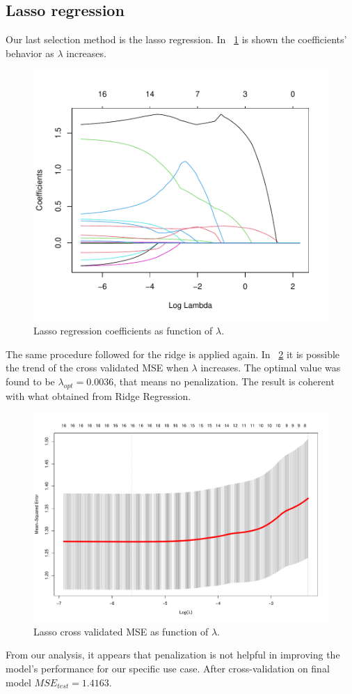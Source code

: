 \subsection{Lasso regression}

Our last selection method is the lasso regression. In \Fig~\ref{fig:LassoCoefVsLambda} is shown the coefficients' behavior as $\lambda$ increases. 

\begin{figure}[H]
	\centering
	\includegraphics[width=0.4\linewidth]{ImageFiles/Regression/Lasso/LassoCoefVsLambda.pdf}
	\caption{Lasso regression coefficients as function of $\lambda$.}
	\label{fig:LassoCoefVsLambda}
\end{figure}

The same procedure followed for the ridge is applied again. In \Fig~\ref{fig:LassoCvPlot} it is possible the trend of the cross validated MSE when $\lambda$ increases. The optimal value was found to be $\lambda_{opt} = 0.0036$, that means no penalization. The result is coherent with what obtained from Ridge Regression.

\begin{figure}[H]
	\centering
	\includegraphics[width=0.5\linewidth]{ImageFiles/Regression/Lasso/LassoCvPlot.pdf}
	\caption{Lasso cross validated MSE as function of $\lambda$.}
	\label{fig:LassoCvPlot}
\end{figure}

From our analysis, it appears that penalization is not helpful in improving the model's performance for our specific use case.
After cross-validation on final model $MSE_{test} = 1.4163$.